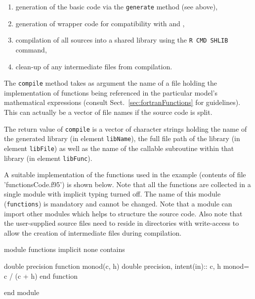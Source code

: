 \documentclass[onecolumn]{article}
\begin{document}
\begin{enumerate}
\item generation of the basic  code via the \verb|generate| method (see above),
\item generation of wrapper code for compatibility with  and ,
\item compilation of all  sources into a shared library using the \verb|R CMD SHLIB| command,
\item clean-up of any intermediate files from compilation.
\end{enumerate}

The \verb|compile| method takes as argument the name of a file holding the  implementation of functions being referenced in the particular model's mathematical expressions (consult Sect.~\ref{sec:fortranFunctions} for guidelines). This can actually be a vector of file names if the source code is split.

\begin{Schunk}
\end{Schunk}

The return value of \verb|compile| is a vector of character strings holding the name of the generated library (in element \verb|libName|), the full file path of the library (in element \verb|libFile|) as well as the name of the callable subroutine within that library (in element \verb|libFunc|).

A suitable  implementation of the functions used in the example (contents of file 'functionsCode.f95') is shown below. Note that all the functions are collected in a single  module with implicit typing turned off. The name of this module (\verb|functions|) is mandatory and cannot be changed. Note that a module can import other modules which helps to structure the source code. Also note that the user-supplied source files need to reside in directories with write-access to allow the creation of intermediate files during compilation.

\begin{shaded}
\begin{Schunk}
\begin{Soutput}
module functions 
   implicit none 
   contains 
  
   double precision function monod(c, h)  
     double precision, intent(in):: c, h 
     monod= c / (c + h) 
   end function 
  
 end module 
\end{Soutput}
\end{Schunk}
\end{shaded}
\end{document}
